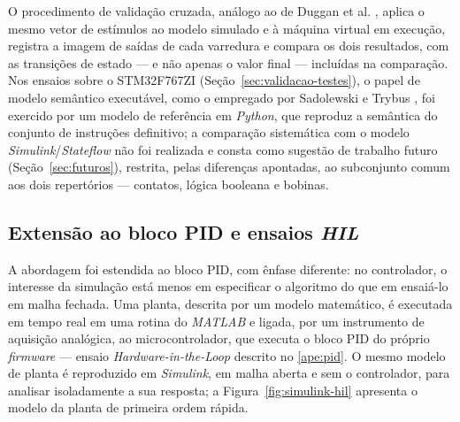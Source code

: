 O procedimento de validação cruzada, análogo ao de Duggan et al. \cite{duggan:2022}, aplica o mesmo vetor de estímulos ao modelo simulado e à máquina virtual em execução, registra a imagem de saídas de cada varredura e compara os dois resultados, com as transições de estado --- e não apenas o valor final --- incluídas na comparação.
Nos ensaios sobre o STM32F767ZI (Seção~\ref{sec:validacao-testes}), o papel de modelo semântico executável, como o empregado por Sadolewski e Trybus \cite{sadolewski:2024}, foi exercido por um modelo de referência em \textit{Python}, que reproduz a semântica do conjunto de instruções definitivo; a comparação sistemática com o modelo \textit{Simulink}/\textit{Stateflow} não foi realizada e consta como sugestão de trabalho futuro (Seção~\ref{sec:futuros}), restrita, pelas diferenças apontadas, ao subconjunto comum aos dois repertórios --- contatos, lógica booleana e bobinas.

\subsection{Extensão ao bloco PID e ensaios \textit{HIL}}
\label{sub:modelo-pid}

A abordagem foi estendida ao bloco PID, com ênfase diferente: no controlador, o interesse da simulação está menos em especificar o algoritmo do que em ensaiá-lo em malha fechada.
Uma planta, descrita por um modelo matemático, é executada em tempo real em uma rotina do \textit{MATLAB} e ligada, por um instrumento de aquisição analógica, ao microcontrolador, que executa o bloco PID do próprio \textit{firmware} --- ensaio \textit{Hardware-in-the-Loop} descrito no \ref{ape:pid}.
O mesmo modelo de planta é reproduzido em \textit{Simulink}, em malha aberta e sem o controlador, para analisar isoladamente a sua resposta; a Figura~\ref{fig:simulink-hil} apresenta o modelo da planta de primeira ordem rápida.

\begin{figurafixa}
    \centering
    \label{fig:simulink-hil}

\end{figurafixa}

